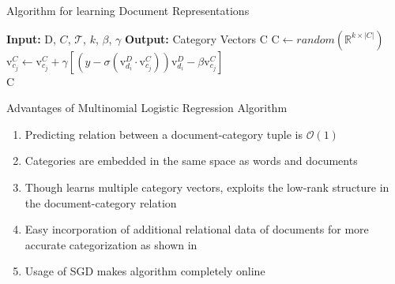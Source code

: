 \documentclass[10pt]{beamer}
\newcommand{\setC}{\ensuremath{C} }
\newcommand{\matD}{\ensuremath{\mathrm{D}} }
\newcommand{\matC}{\ensuremath{\mathrm{C}} }
\newcommand{\vecdi}[1]{\ensuremath{\mathrm{v}^{D}_{#1}}}
\newcommand{\vecci}[1]{\ensuremath{\mathrm{v}^{C}_{#1}}}
\newcommand{\traindata}{\ensuremath{\mathcal{T}}}
\begin{document}

\begin{frame}{Algorithm for learning Document Representations}
\begin{algorithm}[H]
\begin{algorithmic}[1]
 \State \textbf{Input: } $\matD$, $\setC$, $\traindata$, $k$, $\beta$, $\gamma$
 \State \textbf{Output: } Category Vectors $\matC$
 \State $\matC \gets random(\mathbb{R}^{k \times |\setC|})$
 \ForAll{$\{ d_{i}, c_{j}, y\} \in \traindata$}
  \State $\vecci{c_{j}} \gets \vecci{c_{j}} + \gamma \left[ ( y - \sigma(\vecdi{d_{i}}\cdot \vecci{c_{j}})) \vecdi{d_{i}} -\beta\vecci{c_{j}} \right]$
 \EndFor 
 \EndWhile
 \\
 \Return $\matC$
\end{algorithmic}
\caption{Learning Category Vector Representations}
\label{alg:cat_embeddings}
\end{algorithm}
\end{frame}


\begin{frame}{Advantages of Multinomial Logistic Regression Algorithm }

\begin{enumerate}
	\vfill\item<1-> Predicting relation between a document-category tuple is $\mathcal{O}(1)$
	\vfill\item<1-> Categories are embedded in the same space as words and documents
	\vfill\item<1-> Though learns multiple category vectors, exploits the low-rank structure in the document-category relation
	\vfill\item<1-> Easy incorporation of additional relational data of documents for more accurate categorization as shown in \citet{gupta2015collectively}
	\vfill\item<1-> Usage of SGD makes algorithm completely online
\end{enumerate}
\end{frame}

\end{document}
